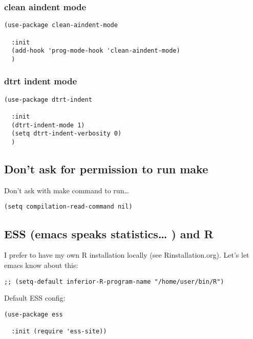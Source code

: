 \documentclass[12pt]{article}
\begin{document}
\subsubsection{clean aindent mode}
\label{sec:orge8c76a3}

\begin{verbatim}
(use-package clean-aindent-mode

  :init
  (add-hook 'prog-mode-hook 'clean-aindent-mode)
  )
\end{verbatim}

\subsubsection{dtrt indent mode}
\label{sec:orgde80bd8}

\begin{verbatim}
(use-package dtrt-indent

  :init
  (dtrt-indent-mode 1)
  (setq dtrt-indent-verbosity 0)
  )
\end{verbatim}

\subsection{Don't ask for permission to run make}
\label{sec:org76b4f37}
Don't ask with make command to run\ldots{}
\begin{verbatim}
(setq compilation-read-command nil)
\end{verbatim}

\subsection{ESS  (emacs speaks statistics\ldots{} ) and R}
\label{sec:org2b197b5}

I prefer to have my own R installation locally (see Rinstallation.org). Let's let emacs know about this:

\begin{verbatim}
;; (setq-default inferior-R-program-name "/home/user/bin/R")
\end{verbatim}

Default ESS config:
\begin{verbatim}
(use-package ess

  :init (require 'ess-site))
\end{verbatim}
\end{document}
